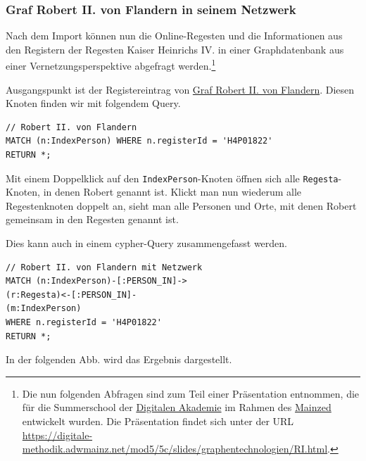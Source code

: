 \documentclass[ngerman,]{scrreprt}
\begin{document}
\subsubsection{Graf Robert II. von Flandern in seinem Netzwerk}\label{graf-robert-ii.-von-flandern-in-seinem-netzwerk}

Nach dem Import können nun die Online-Regesten und die Informationen aus den Registern der Regesten Kaiser Heinrichs IV. in einer Graphdatenbank aus einer Vernetzungsperspektive abgefragt werden.\footnote{Die nun folgenden Abfragen sind zum Teil einer Präsentation entnommen, die für die Summerschool der \href{https://www.digitale-akademie.de}{Digitalen Akademie} im Rahmen des \href{https://www.mainzed.org/de}{Mainzed} entwickelt wurden. Die Präsentation findet sich unter der URL \url{https://digitale-methodik.adwmainz.net/mod5/5c/slides/graphentechnologien/RI.html}.}

Ausgangspunkt ist der Registereintrag von \href{https://de.wikipedia.org/wiki/Robert_II._(Flandern)}{Graf Robert II. von Flandern}. Diesen Knoten finden wir mit folgendem Query.

\begin{verbatim}
// Robert II. von Flandern
MATCH (n:IndexPerson) WHERE n.registerId = 'H4P01822'
RETURN *;
\end{verbatim}

Mit einem Doppelklick auf den \texttt{IndexPerson}-Knoten öffnen sich alle \texttt{Regesta}-Knoten, in denen Robert genannt ist. Klickt man nun wiederum alle Regestenknoten doppelt an, sieht man alle Personen und Orte, mit denen Robert gemeinsam in den Regesten genannt ist.

Dies kann auch in einem cypher-Query zusammengefasst werden.

\begin{verbatim}
// Robert II. von Flandern mit Netzwerk
MATCH (n:IndexPerson)-[:PERSON_IN]->
(r:Regesta)<-[:PERSON_IN]-
(m:IndexPerson)
WHERE n.registerId = 'H4P01822'
RETURN *;
\end{verbatim}

In der folgenden Abb. wird das Ergebnis dargestellt.
\end{document}
